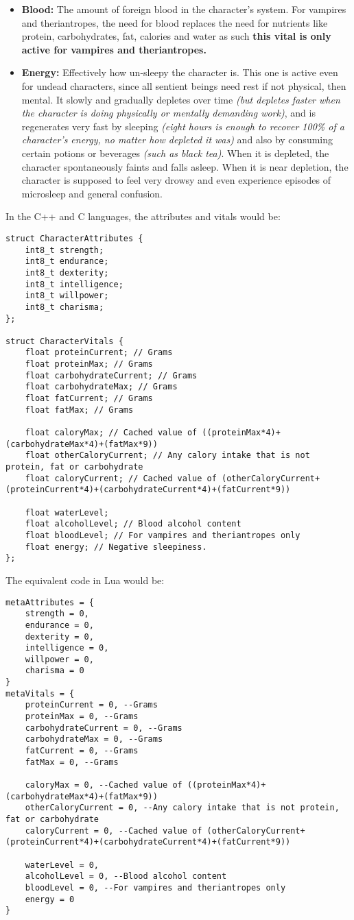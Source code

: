 \documentclass[openany,11pt,a4paper]{book}
\begin{document}
\begin{itemize}
\item \textbf{Blood:} The amount of foreign blood in the character's system. For vampires and theriantropes, the need for blood replaces the need for nutrients like protein, carbohydrates, fat, calories and water \textemdash as such \textbf{this vital is only active for vampires and theriantropes.}
\item \textbf{Energy:} Effectively how un-sleepy the character is. This one is active even for undead characters, since all sentient beings need rest \textemdash if not physical, then mental. It slowly and gradually depletes over time \textit{(but depletes faster when the character is doing physically or mentally demanding work)}, and is regenerates very fast by sleeping \textit{(eight hours is enough to recover 100\% of a character's energy, no matter how depleted it was)} and also by consuming certain potions or beverages  \textit{(such as black tea)}. When it is depleted, the character spontaneously faints and falls asleep. When it is near depletion, the character is supposed to feel very drowsy and even experience episodes of microsleep and general confusion.
\end{itemize}
In the C++ and C languages, the attributes and vitals would be:
\begin{lstlisting}[style=CPPStyle]
struct CharacterAttributes {
	int8_t strength;
	int8_t endurance;
	int8_t dexterity;
	int8_t intelligence;
	int8_t willpower;
	int8_t charisma;
};

struct CharacterVitals {
	float proteinCurrent; // Grams
	float proteinMax; // Grams
	float carbohydrateCurrent; // Grams
	float carbohydrateMax; // Grams
	float fatCurrent; // Grams
	float fatMax; // Grams
	
	float caloryMax; // Cached value of ((proteinMax*4)+(carbohydrateMax*4)+(fatMax*9))
	float otherCaloryCurrent; // Any calory intake that is not protein, fat or carbohydrate
	float caloryCurrent; // Cached value of (otherCaloryCurrent+(proteinCurrent*4)+(carbohydrateCurrent*4)+(fatCurrent*9))
	
	float waterLevel;
	float alcoholLevel; // Blood alcohol content
	float bloodLevel; // For vampires and theriantropes only
	float energy; // Negative sleepiness.
};
\end{lstlisting}
The equivalent code in Lua would be:
\begin{lstlisting}[style=LuaStyle]
metaAttributes = {
	strength = 0,
	endurance = 0,
	dexterity = 0,
	intelligence = 0,
	willpower = 0,
	charisma = 0
}
metaVitals = {
	proteinCurrent = 0, --Grams
	proteinMax = 0, --Grams
	carbohydrateCurrent = 0, --Grams
	carbohydrateMax = 0, --Grams
	fatCurrent = 0, --Grams
	fatMax = 0, --Grams
	
	caloryMax = 0, --Cached value of ((proteinMax*4)+(carbohydrateMax*4)+(fatMax*9))
	otherCaloryCurrent = 0, --Any calory intake that is not protein, fat or carbohydrate
	caloryCurrent = 0, --Cached value of (otherCaloryCurrent+(proteinCurrent*4)+(carbohydrateCurrent*4)+(fatCurrent*9))
	
	waterLevel = 0,
	alcoholLevel = 0, --Blood alcohol content
	bloodLevel = 0, --For vampires and theriantropes only
	energy = 0
}
\end{lstlisting}
\end{document}

